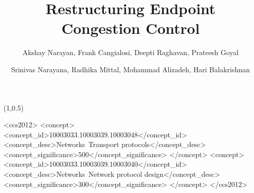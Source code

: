 \documentclass[format=sigconf,10pt,natbib=false]{acmart}
\begin{document}
\begin{textblock}{13.5}(1,0.5)
\end{textblock}

\title{Restructuring Endpoint Congestion Control}
\author{Akshay Narayan, Frank Cangialosi, Deepti Raghavan, Prateesh Goyal}
\author{Srinivas Narayana, Radhika Mittal, Mohammad Alizadeh, Hari Balakrishnan}
\begin{CCSXML}
<ccs2012>
<concept>
<concept_id>10003033.10003039.10003048</concept_id>
<concept_desc>Networks~Transport protocols</concept_desc>
<concept_significance>500</concept_significance>
</concept>
<concept>
<concept_id>10003033.10003039.10003040</concept_id>
<concept_desc>Networks~Network protocol design</concept_desc>
<concept_significance>300</concept_significance>
</concept>
</ccs2012>
\end{CCSXML}

\newcommand*{\origrightarrow}{$\rightarrow$}
\let\oldarrow\textrightarrow
\renewcommand*{\textrightarrow}{\fontfamily{cmr}\selectfont\origrightarrow}
\renewcommand{\shortauthors}{Akshay Narayan, Frank Cangialosi, Deepti Raghavan, et al.}

\begin{sloppypar}

\maketitle












\begin{appendices}

\end{appendices}
\end{sloppypar}
\end{document}
